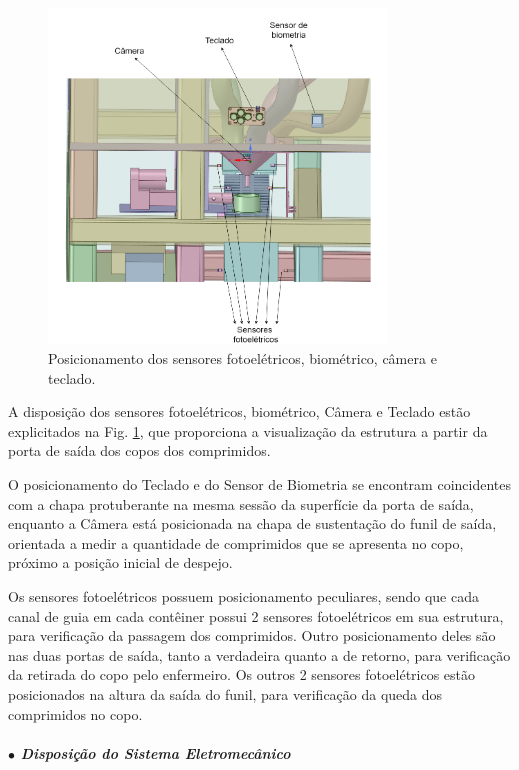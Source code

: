 \begin{figure}[H]
        \centering
        \includegraphics[width=0.8\textwidth]{figuras/estrutura/Design/Diagrama_sensores.png}
        \caption{Posicionamento dos sensores fotoelétricos, biométrico, câmera e teclado.}
        \label{fig:Vista_sensores_2}
    \end{figure}
    
A disposição dos sensores fotoelétricos, biométrico, Câmera e Teclado estão explicitados na Fig. \ref{fig:Vista_sensores_2}, que proporciona a visualização da estrutura a partir da porta de saída dos copos dos comprimidos. 

O posicionamento do Teclado e do Sensor de Biometria se encontram coincidentes com a chapa protuberante na mesma sessão da superfície da porta de saída, enquanto a Câmera está posicionada na chapa de sustentação do funil de saída, orientada a medir a quantidade de comprimidos que se apresenta no copo, próximo a posição inicial de despejo. 

Os sensores fotoelétricos possuem posicionamento peculiares, sendo que cada canal de guia em cada contêiner possui 2 sensores fotoelétricos em sua estrutura, para verificação da passagem dos comprimidos. Outro posicionamento deles são nas duas portas de saída, tanto a verdadeira quanto a de retorno, para verificação da retirada do copo pelo enfermeiro. Os outros 2 sensores fotoelétricos estão posicionados na altura da saída do funil, para verificação da queda dos comprimidos no copo.

\subparagraph*{$\bullet$ Disposição do Sistema Eletromecânico} \hfill

